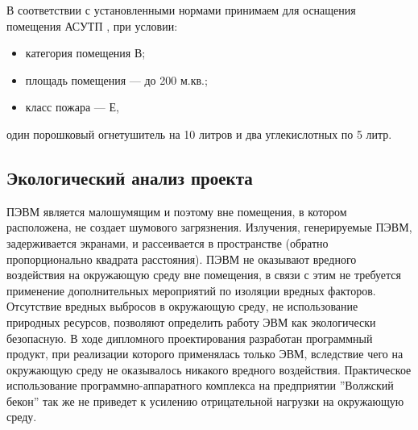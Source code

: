 В соответствии с установленными нормами  принимаем для оснащения помещения АСУТП , при условии:
\begin{itemize}
	\item{} категория помещения  В;
	\item{} площадь помещения --- до 200 м.кв.;
	\item{} класс пожара --- Е,
\end{itemize}
один порошковый огнетушитель на 10 литров и два углекислотных  по 5 литр.


\subsection{Экологический анализ проекта}
ПЭВМ является малошумящим и поэтому вне помещения, в котором расположена, не создает
шумового загрязнения. Излучения, генерируемые ПЭВМ, задерживается экранами, и рассеивается в
пространстве (обратно пропорционально квадрата расстояния). ПЭВМ не оказывают вредного
воздействия на окружающую среду вне помещения, в связи с этим не требуется применение
дополнительных мероприятий по изоляции вредных факторов.
Отсутствие вредных выбросов в окружающую среду, не использование природных ресурсов,
позволяют определить работу ЭВМ как экологически безопасную. В ходе дипломного проектирования
разработан программный продукт, при реализации которого применялась только ЭВМ, вследствие
чего на окружающую среду не оказывалось никакого вредного воздействия. Практическое использование
программно-аппаратного комплекса на предприятии ''Волжский бекон'' так же не приведет к усилению
отрицательной нагрузки на окружающую среду.





















